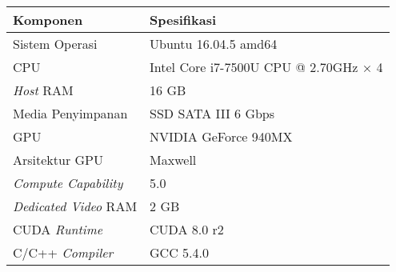 \begin{tabular}{|l|l|}

\hline
\rowcolor{gray!15}
Komponen & Spesifikasi \\
\hline

Sistem Operasi & Ubuntu 16.04.5 amd64 \\
\hline

CPU & Intel Core i7-7500U CPU @ 2.70GHz × 4 \\
\hline

\emph{Host} RAM & 16 GB \\
\hline

Media Penyimpanan & SSD SATA III 6 Gbps \\
\hline

GPU & NVIDIA GeForce 940MX \\
\hline

Arsitektur GPU & Maxwell \\
\hline

\emph{Compute Capability} & 5.0 \\
\hline

\emph{Dedicated Video} RAM & 2 GB \\
\hline

CUDA \emph{Runtime} & CUDA 8.0 r2 \\
\hline

C/C++ \emph{Compiler} & GCC 5.4.0 \\
\hline

\end{tabular}
